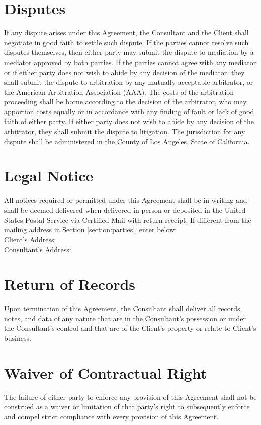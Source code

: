 \documentclass{article}
\begin{document}
\section{Disputes}
If any dispute arises under this Agreement, the Consultant and the Client shall negotiate in good faith to settle such dispute. If the parties cannot resolve such disputes themselves, then either party may submit the dispute to mediation by a mediator approved by both parties. If the parties cannot agree with any mediator or if either party does not wish to abide by any decision of the mediator, they shall submit the dispute to arbitration by any mutually acceptable arbitrator, or the American Arbitration Association (AAA). The costs of the arbitration proceeding shall be borne according to the decision of the arbitrator, who may apportion costs equally or in accordance with any finding of fault or lack of good faith of either party. If either party does not wish to abide by any decision of the arbitrator, they shall submit the dispute to litigation. The jurisdiction for any dispute shall be administered in the County of Los Angeles, State of California.

\section{Legal Notice}
All notices required or permitted under this Agreement shall be in writing and shall be deemed delivered when delivered in-person or deposited in the United States Postal Service via Certified Mail with return receipt. If different from the mailing address in Section \ref{section:parties}, enter below: \\
Client's Address: \clientaddralt \\
Consultant's Address: \consultantaddralt

\section{Return of Records}
Upon termination of this Agreement, the Consultant shall deliver all records, notes, and data of any nature that are in the Consultant's possession or under the Consultant's control and that are of the Client's property or relate to Client's business.

\section{Waiver of Contractual Right}
The failure of either party to enforce any provision of this Agreement shall not be construed as a waiver or limitation of that party's right to subsequently enforce and compel strict compliance with every provision of this Agreement.
\end{document}
